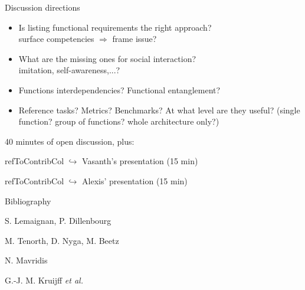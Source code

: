 \documentclass[compress]{beamer}
\newcommand{\refToContrib}[1]{%
    \begin{beamercolorbox}[wd=\linewidth,ht=2ex,dp=0.7ex]{refToContribCol}%
    \hspace{0.5em}$\hookrightarrow$ #1%
    \end{beamercolorbox}%
}%
\begin{document}
\begin{frame}{Discussion directions}
    

    \begin{itemize}
        \item Is listing functional requirements the right approach?\\ {\Medium surface competencies $\Rightarrow$ frame issue?}
        \item What are the missing ones for social interaction?\\ {\Medium imitation, self-awareness,...?}
        \item Functions interdependencies? Functional entanglement?
        \item Reference tasks? Metrics? Benchmarks? At what level are they useful? (single function? group of functions? whole architecture only?)
    \end{itemize}

    40 minutes of open discussion, plus:
    \refToContrib{Vasanth's presentation (15 min)}
    \refToContrib{Alexis' presentation (15 min)}

\end{frame}


\begin{frame}{Bibliography}
\begin{thebibliography}{10}

    \beamertemplatearticlebibitems
    S. Lemaignan, P. Dillenbourg
    \newblock {}

    \beamertemplatearticlebibitems
    M. Tenorth, D. Nyga, M. Beetz
    \newblock {}

    \beamertemplatearticlebibitems
    N. Mavridis
    \newblock {}



    \beamertemplatearticlebibitems
    G.-J. M. Kruijff \emph{et al.}
    \newblock {}



  \end{thebibliography}
\end{frame}
\end{document}
